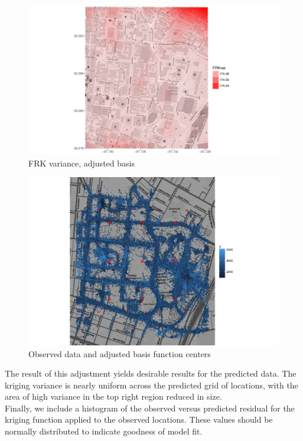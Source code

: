 \documentclass[11pt]{article}
\begin{document}
\begin{figure}[H]
\centering
\includegraphics[width=160mm,keepaspectratio]{Images/var_newgrid.pdf}
\caption{FRK variance, adjusted basis \label{fig:8}}
\end{figure}

\begin{figure}[H]
\centering
\includegraphics[width=120mm,keepaspectratio]{Images/data_grid_new.png}
\caption{Observed data and adjusted basis function centers \label{fig:9}}
\end{figure}

The result of this adjustment yields desirable results for the predicted data.  The kriging variance is nearly uniform across the predicted grid of locations, with the area of high variance in the top right region reduced in size.\\

Finally, we include a histogram of the observed versus predicted residual for the kriging function applied to the observed locations.  These values should be normally distributed to indicate goodness of model fit.\\
\end{document}
